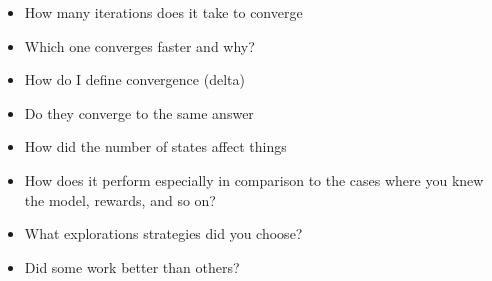 \documentclass[11pt]{article}
\begin{document}
    \begin{itemize}
        \item How many iterations does it take to converge
        \item Which one converges faster and why?
        \item How do I define convergence (delta)
        \item Do they converge to the same answer
        \item How did the number of states affect things
    \end{itemize}
    \begin{itemize}
        \item How does it perform especially in comparison to the cases where you knew the model, rewards, and so on?
        \item What explorations strategies did you choose?
        \item Did some work better than others?
    \end{itemize}
\end{document}
